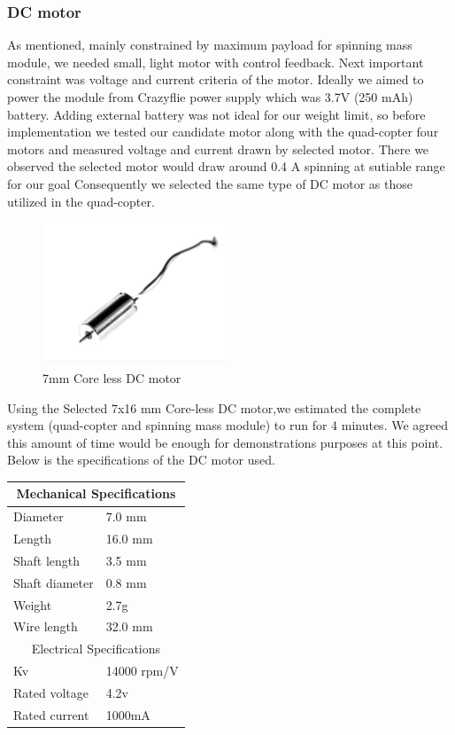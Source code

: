 \subsubsection{DC motor}
As mentioned, mainly constrained by maximum payload for spinning mass module, we needed small, light motor with control feedback. Next important constraint was voltage and current criteria of the motor. Ideally we aimed to power the module from Crazyflie power supply which was 3.7V (250 mAh) battery. Adding external battery was not ideal for our weight limit, so before implementation we tested our candidate motor along with the quad-copter four motors and measured voltage and current drawn by selected motor. There we observed the selected motor would draw around 0.4 A spinning at sutiable range for our goal Consequently we selected the same type of DC motor as those utilized in the quad-copter. 
\begin{figure}[h]
\centering
\includegraphics[width=0.5\textwidth]{./Amir_img/DCmotor.png}
\caption{7mm Core less DC motor}
\end{figure}
\newline 
Using the Selected 7x16 mm Core-less DC motor,we estimated the complete system (quad-copter and spinning mass module) to run for 4 minutes. We agreed this amount of time would be enough for demonstrations purposes at this point. Below is the specifications of the DC motor used.
\newline
\begin{center}
\begin{tabular}{ |p{3cm}|p{3cm}|  }
 \hline
 \multicolumn{2}{|c|}{Mechanical Specifications} \\
 \hline
 Diameter   & 7.0 mm    \\
 Length &   16.0 mm  \\
 Shaft length & 3.5 mm  \\
 Shaft diameter    & 0.8 mm \\
 Weight &   2.7g \\
 Wire length & 32.0 mm  \\
 \hline
 \multicolumn{2}{|c|}{Electrical Specifications} \\
 \hline 
 Kv & 14000 rpm/V \\
 Rated voltage & 4.2v \\
 Rated current & 1000mA\\
 \hline
\end{tabular}
\end{center}
  
